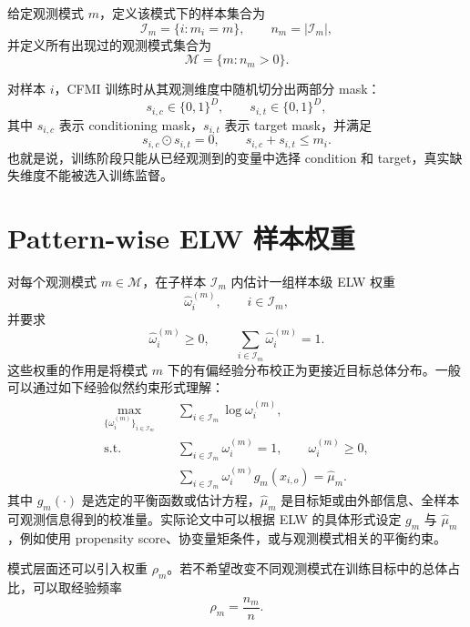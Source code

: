 \documentclass[12pt,a4paper]{article}
\newcommand{\Mcal}{\mathcal{M}}
\newcommand{\Ical}{\mathcal{I}}
\newcommand{\what}{\widehat}
\begin{document}
给定观测模式 $m$，定义该模式下的样本集合为
\begin{equation}
    \Ical_m=\{i:m_i=m\},\qquad n_m=|\Ical_m|,
\end{equation}
并定义所有出现过的观测模式集合为
\begin{equation}
    \Mcal=\{m:n_m>0\}.
\end{equation}

对样本 $i$，CFMI 训练时从其观测维度中随机切分出两部分 mask：
\begin{equation}
    s_{i,c}\in\{0,1\}^D,\qquad s_{i,t}\in\{0,1\}^D,
\end{equation}
其中 $s_{i,c}$ 表示 conditioning mask，$s_{i,t}$ 表示 target mask，并满足
\begin{equation}
    s_{i,c}\odot s_{i,t}=0,
    \qquad
    s_{i,c}+s_{i,t}\leq m_i.
\end{equation}
也就是说，训练阶段只能从已经观测到的变量中选择 condition 和 target，真实缺失维度不能被选入训练监督。

\section{Pattern-wise ELW 样本权重}

对每个观测模式 $m\in\Mcal$，在子样本 $\Ical_m$ 内估计一组样本级 ELW 权重
\begin{equation}
    \what{\omega}^{(m)}_i,
    \qquad i\in\Ical_m,
\end{equation}
并要求
\begin{equation}
    \what{\omega}^{(m)}_i\geq 0,
    \qquad
    \sum_{i\in\Ical_m}\what{\omega}^{(m)}_i=1.
\end{equation}
这些权重的作用是将模式 $m$ 下的有偏经验分布校正为更接近目标总体分布。一般可以通过如下经验似然约束形式理解：
\begin{align}
    \max_{\{\omega^{(m)}_i\}_{i\in\Ical_m}}\quad
    &\sum_{i\in\Ical_m}\log \omega^{(m)}_i,\\
    \text{s.t.}\quad
    &\sum_{i\in\Ical_m}\omega^{(m)}_i=1,
    \qquad \omega^{(m)}_i\geq 0,\\
    &\sum_{i\in\Ical_m}\omega^{(m)}_i g_m(x_{i,o})=\what{\mu}_m.
\end{align}
其中 $g_m(\cdot)$ 是选定的平衡函数或估计方程，$\what{\mu}_m$ 是目标矩或由外部信息、全样本可观测信息得到的校准量。实际论文中可以根据 ELW 的具体形式设定 $g_m$ 与 $\what{\mu}_m$，例如使用 propensity score、协变量矩条件，或与观测模式相关的平衡约束。

模式层面还可以引入权重 $\rho_m$。若不希望改变不同观测模式在训练目标中的总体占比，可以取经验频率
\begin{equation}
    \rho_m=\frac{n_m}{n}.
\end{equation}
\end{document}
